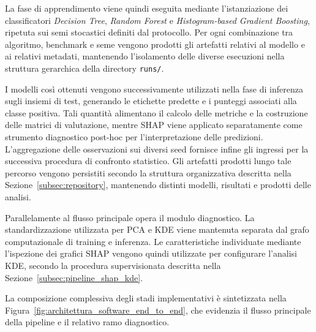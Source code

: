 La fase di apprendimento viene quindi eseguita mediante l'istanziazione dei classificatori \textit{Decision Tree}, \textit{Random Forest} e \textit{Histogram-based Gradient Boosting}, ripetuta sui semi stocastici definiti dal protocollo.
Per ogni combinazione tra algoritmo, benchmark e seme vengono prodotti gli artefatti relativi al modello e ai relativi metadati, mantenendo l'isolamento delle diverse esecuzioni nella struttura gerarchica della directory \texttt{runs/}.
 
I modelli così ottenuti vengono successivamente utilizzati nella fase di inferenza sugli insiemi di test, generando le etichette predette e i punteggi associati alla classe positiva.
Tali quantità alimentano il calcolo delle metriche e la costruzione delle matrici di valutazione, mentre SHAP viene applicato separatamente come strumento diagnostico post-hoc per l'interpretazione delle predizioni. L'aggregazione delle osservazioni sui diversi seed fornisce infine gli ingressi per la successiva procedura di confronto statistico.
Gli artefatti prodotti lungo tale percorso vengono persistiti secondo la struttura organizzativa descritta nella Sezione~\ref{subsec:repository}, mantenendo distinti modelli, risultati e prodotti delle analisi.
 
Parallelamente al flusso principale opera il modulo diagnostico.
La standardizzazione utilizzata per PCA e KDE viene mantenuta separata dal grafo computazionale di training e inferenza.
Le caratteristiche individuate mediante l'ispezione dei grafici SHAP vengono quindi utilizzate per configurare l'analisi KDE, secondo la procedura supervisionata descritta nella Sezione~\ref{subsec:pipeline_shap_kde}.
 
La composizione complessiva degli stadi implementativi è sintetizzata nella Figura~\ref{fig:architettura_software_end_to_end}, che evidenzia il flusso principale della pipeline e il relativo ramo diagnostico.
 
